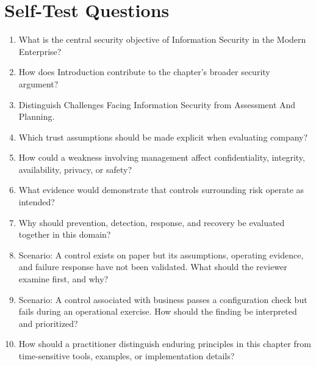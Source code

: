 \documentclass[11pt]{article}
\begin{document}
\section*{Self-Test Questions}
\begin{enumerate}
\item What is the central security objective of Information Security in the Modern Enterprise?
\item How does Introduction contribute to the chapter's broader security argument?
\item Distinguish Challenges Facing Information Security from Assessment And Planning.
\item Which trust assumptions should be made explicit when evaluating company?
\item How could a weakness involving management affect confidentiality, integrity, availability, privacy, or safety?
\item What evidence would demonstrate that controls surrounding risk operate as intended?
\item Why should prevention, detection, response, and recovery be evaluated together in this domain?
\item Scenario: A control exists on paper but its assumptions, operating evidence, and failure response have not been validated. What should the reviewer examine first, and why?
\item Scenario: A control associated with business passes a configuration check but fails during an operational exercise. How should the finding be interpreted and prioritized?
\item How should a practitioner distinguish enduring principles in this chapter from time-sensitive tools, examples, or implementation details?
\end{enumerate}
\end{document}
